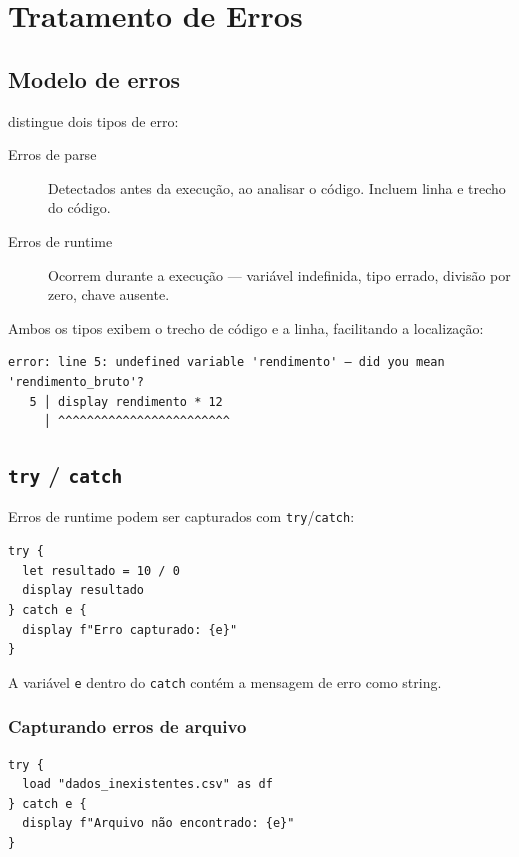 \chapter{Tratamento de Erros}

\section{Modelo de erros}

\hayashi{} distingue dois tipos de erro:

\begin{description}
  \item[Erros de parse] Detectados antes da execução, ao analisar o código.
        Incluem linha e trecho do código.
  \item[Erros de runtime] Ocorrem durante a execução — variável indefinida,
        tipo errado, divisão por zero, chave ausente.
\end{description}

Ambos os tipos exibem o trecho de código e a linha, facilitando a localização:

\begin{lstlisting}[style=inline]
error: line 5: undefined variable 'rendimento' — did you mean 'rendimento_bruto'?
   5 │ display rendimento * 12
     │ ^^^^^^^^^^^^^^^^^^^^^^^^
\end{lstlisting}

\section{\texttt{try} / \texttt{catch}}

Erros de runtime podem ser capturados com \lstinline{try}/\lstinline{catch}:

\begin{lstlisting}[caption={try/catch básico}]
try {
  let resultado = 10 / 0
  display resultado
} catch e {
  display f"Erro capturado: {e}"
}
\end{lstlisting}

A variável \lstinline{e} dentro do \lstinline{catch} contém a mensagem de erro
como string.

\subsection*{Capturando erros de arquivo}

\begin{lstlisting}
try {
  load "dados_inexistentes.csv" as df
} catch e {
  display f"Arquivo não encontrado: {e}"
}
\end{lstlisting}

